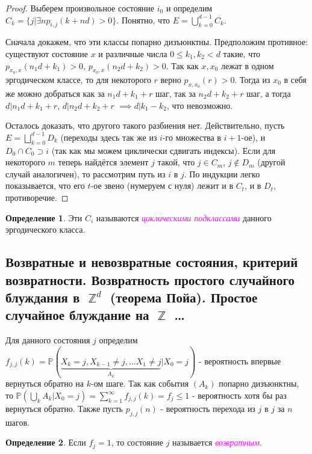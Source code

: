 \documentclass[a4paper,100pt]{article}
\theoremstyle{indented}
\theoremstyle{definition}
\newtheorem{defn}{Определение}
\theoremstyle{remark}
\DeclareMathOperator{\ZZ}{\mathbb{Z}}
\begin{document}
\begin{proof}
  Выберем произвольное состояние $i_0$ и определим $C_k=\{j | \exists n p_{i, j}(k+nd)>0\}$. Понятно, что $E= \bigcup_{k=0}^{d-1}C_k$. \ 
  
  Сначала докажем, что эти классы попарно дизъюнктны. Предположим противное: существуют состояние $x$ и различные числа $0 \leq k_1, k_2 <d$ такие, что $p_{x_0, x}(n_1d+k_1)>0$, $p_{x_0, x}(n_2d+k_2)>0$. Так как $x, x_0$ лежат в одном эргодическом классе, то для некоторого $r$ верно $p_{x, x_0}(r)>0$. Тогда из $x_0$ в себя же можно добраться как за $n_1d+k_1+r$ шаг, так за $n_2d+k_2+r$ шаг, а тогда $d | n_1d+k_1+r$, $d | n_2d+k_2+r$ $\implies d | k_1-k_2$, что невозможно. \
  
  Осталось доказать, что другого такого разбиения нет. Действительно, пусть $E=\bigsqcup_{k=0}^{d-1} D_k$ (переходы здесь так же из $i$-го множества в $i+1$-ое), и $D_0 \cap C_0 \supset i$ (так как мы можем циклически сдвигать индексы). Если для некоторого $m$ теперь найдётся элемент $j$ такой, что $j \in C_m$, $j \notin D_m$ (другой случай аналогичен), то рассмотрим путь из $i$ в $j$. По индукции легко показывается, что его $t$-ое звено (нумеруем с нуля) лежит и в $C_t$, и в $D_t$, противоречие.
\end{proof}

\begin{defn}
  Эти $C_i$ называются \hypertarget{n41}{\textcolor{magenta}{\textit{циклическими подклассами}}} данного эргодического класса.
\end{defn}

\subsection{Возвратные и невозвратные состояния, критерий возвратности. Возвратность простого случайного блуждания в $\ZZ^d$ (теорема Пойа). Простое случайное блуждание на $\ZZ$ \ldots}

Для данного состояния $j$ определим $f_{j, j}(k)=\mathbb{P}(\underbrace{X_k=j, X_{k-1} \neq j, ... X_1 \neq j}_{A_k} | X_0=j)$ - вероятность впервые вернуться обратно на $k$-ом шаге. Так как события $(A_k)$ попарно дизъюнктны, то $\mathbb{P}(\bigcup_k A_k | X_0=j)=\sum_{k=1}^{\infty} f_{j, j}(k) = f_j \leq 1$ - вероятность хотя бы раз вернуться обратно. Также пусть $p_{j, j}(n)$ - вероятность перехода из $j$ в $j$ за $n$ шагов.

\begin{defn}
  Если $f_j=1$, то состояние $j$ называется \hypertarget{n42}{\textcolor{magenta}{\textit{возвратным}}}.
\end{defn}
\end{document}
